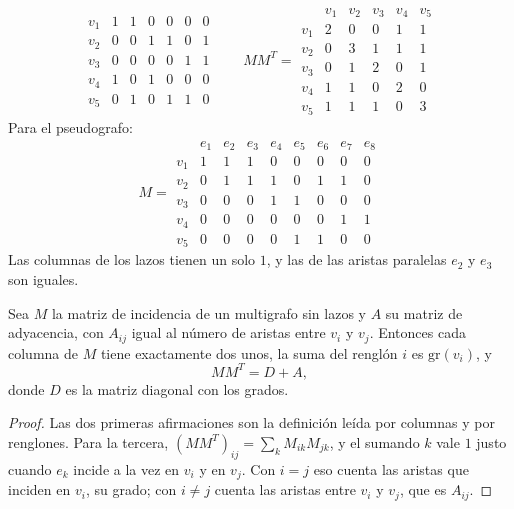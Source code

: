 \documentclass[11pt,letterpaper]{article}
\begin{document}
\begin{ejemplo}[Diapositivas 41 y 44]
\[\begin{array}{c|cccccc}
      v_1 & 1 & 1 & 0 & 0 & 0 & 0 \\
      v_2 & 0 & 0 & 1 & 1 & 0 & 1 \\
      v_3 & 0 & 0 & 0 & 0 & 1 & 1 \\
      v_4 & 1 & 0 & 1 & 0 & 0 & 0 \\
      v_5 & 0 & 1 & 0 & 1 & 1 & 0
    \end{array}
    \qquad
    M M^{T} = \begin{array}{c|ccccc}
        & v_1 & v_2 & v_3 & v_4 & v_5 \\ \hline
      v_1 & 2 & 0 & 0 & 1 & 1 \\
      v_2 & 0 & 3 & 1 & 1 & 1 \\
      v_3 & 0 & 1 & 2 & 0 & 1 \\
      v_4 & 1 & 1 & 0 & 2 & 0 \\
      v_5 & 1 & 1 & 1 & 0 & 3
    \end{array}
  \]
  Para el pseudografo:
  \[
    M = \begin{array}{c|cccccccc}
        & e_1 & e_2 & e_3 & e_4 & e_5 & e_6 & e_7 & e_8 \\ \hline
      v_1 & 1 & 1 & 1 & 0 & 0 & 0 & 0 & 0 \\
      v_2 & 0 & 1 & 1 & 1 & 0 & 1 & 1 & 0 \\
      v_3 & 0 & 0 & 0 & 1 & 1 & 0 & 0 & 0 \\
      v_4 & 0 & 0 & 0 & 0 & 0 & 0 & 1 & 1 \\
      v_5 & 0 & 0 & 0 & 0 & 1 & 1 & 0 & 0
    \end{array}
  \]
  Las columnas de los lazos tienen un solo $1$, y las de las aristas
  paralelas $e_2$ y $e_3$ son iguales.
\end{ejemplo}

\begin{proposicion}
  \label{prop:incidencia}
  Sea $M$ la matriz de incidencia de un multigrafo sin lazos y $A$ su
  matriz de adyacencia, con $A_{ij}$ igual al número de aristas entre
  $v_i$ y $v_j$. Entonces cada columna de $M$ tiene exactamente dos
  unos, la suma del renglón $i$ es $\text{gr}(v_i)$, y
  \[
    M M^{T} = D + A ,
  \]
  donde $D$ es la matriz diagonal con los grados.
\end{proposicion}

\begin{proof}
  Las dos primeras afirmaciones son la definición leída por columnas y
  por renglones. Para la tercera,
  $(M M^{T})_{ij} = \sum_{k} M_{ik} M_{jk}$, y el sumando $k$ vale $1$
  justo cuando $e_k$ incide a la vez en $v_i$ y en $v_j$. Con
  $i = j$ eso cuenta las aristas que inciden en $v_i$, su grado; con
  $i \neq j$ cuenta las aristas entre $v_i$ y $v_j$, que es $A_{ij}$.
\end{proof}
\end{document}
